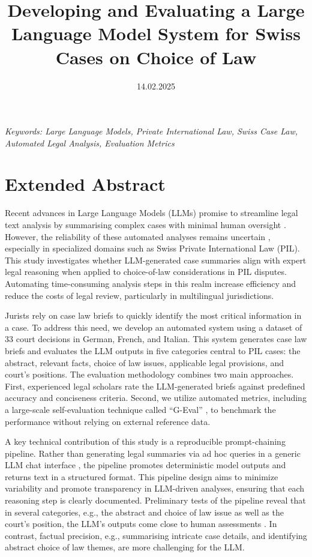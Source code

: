 \documentclass[a4paper,12pt]{article}
\title{Developing and Evaluating a Large Language Model System for Swiss Cases on Choice of Law}
\date{14.02.2025}
\begin{document}
\maketitle
\thispagestyle{fancy}

\begin{center}
\textit{Keywords: Large Language Models, Private International Law, Swiss Case Law, Automated Legal Analysis, Evaluation Metrics}
\newline
\end{center}

\section*{Extended Abstract}

Recent advances in Large Language Models (LLMs) promise to streamline legal text analysis by summarising complex cases with minimal human oversight \parencite{pereira_inacia_2024}. However, the reliability of these automated analyses remains uncertain \parencite{deroy_applicability_2024}, especially in specialized domains such as Swiss Private International Law (PIL). This study investigates whether LLM-generated case summaries align with expert legal reasoning when applied to choice-of-law considerations in PIL disputes. Automating time-consuming analysis steps in this realm increase efficiency and reduce the costs of legal review, particularly in multilingual jurisdictions.

Jurists rely on case law briefs to quickly identify the most critical information in a case. To address this need, we develop an automated system using a dataset of 33 court decisions in German, French, and Italian. This system generates case law briefs and evaluates the LLM outputs in five categories central to PIL cases: the abstract, relevant facts, choice of law issues, applicable legal provisions, and court's positions. The evaluation methodology combines two main approaches. First, experienced legal scholars rate the LLM-generated briefs against predefined accuracy and conciseness criteria. Second, we utilize automated metrics, including a large-scale self-evaluation technique called ``G-Eval'' \parencite{liu2023gevalnlgevaluationusing}, to benchmark the performance without relying on external reference data.

A key technical contribution of this study is a reproducible prompt-chaining pipeline. Rather than generating legal summaries via ad hoc queries in a generic LLM chat interface \parencite{qin_is_2023}, the pipeline promotes deterministic model outputs \parencite{atil2024llmstabilitydetailedanalysis} and returns text in a structured format. This pipeline design aims to minimize variability and promote transparency in LLM-driven analyses, ensuring that each reasoning step is clearly documented. Preliminary tests of the pipeline reveal that in several categories, e.g., the abstract and choice of law issue as well as the court's position, the LLM's outputs come close to human assessments \parencite{anon_2025}. In contrast, factual precision, e.g., summarising intricate case details, and identifying abstract choice of law themes, are more challenging for the LLM.
\end{document}
